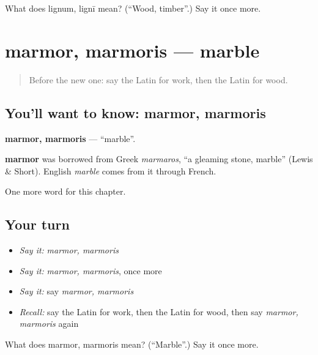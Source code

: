 \begin{tcolorbox}[breakable,colback=teal!4,colframe=teal!35!black,title={Before you move on}]
What does lignum, lignī mean? (\textquotedblleft{}Wood, timber\textquotedblright{}.) Say it once more.
\end{tcolorbox}
\section[marmor, marmoris]{marmor, marmoris — marble}

\label{lesson:LA-C249-marmor}



\begin{quote}
Before the new one: say the Latin for work, then the Latin for wood.
\end{quote}

\subsection*{You'll want to know: marmor, marmoris}
\textbf{marmor, marmoris} — \textquotedblleft{}marble\textquotedblright{}.

\begin{cousinweb}
\textbf{marmor} was borrowed from Greek \emph{marmaros}, \textquotedblleft{}a gleaming stone, marble\textquotedblright{} (Lewis \& Short). English \emph{marble} comes from it through French.
\end{cousinweb}

\begin{grammarlens}[title={What you've built}]
One more word for this chapter.
\end{grammarlens}

\subsection*{Your turn}
\begin{itemize}
\raggedright
  \item \emph{Say it:} \emph{marmor, marmoris}
  \item \emph{Say it:} \emph{marmor, marmoris}, once more
  \item \emph{Say it:} say \emph{marmor, marmoris}
  \item \emph{Recall:} say the Latin for work, then the Latin for wood, then say \emph{marmor, marmoris} again
\end{itemize}

\begin{tcolorbox}[breakable,colback=teal!4,colframe=teal!35!black,title={Before you move on}]
What does marmor, marmoris mean? (\textquotedblleft{}Marble\textquotedblright{}.) Say it once more.
\end{tcolorbox}
